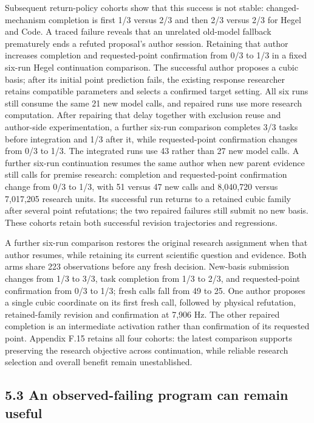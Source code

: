 \documentclass[11pt,a4paper]{article}
\begin{document}
Subsequent return-policy cohorts show that this success is not stable: changed-mechanism completion is first 1/3 versus 2/3 and then 2/3 versus 2/3 for Hegel and Code. A traced failure reveals that an unrelated old-model fallback prematurely ends a refuted proposal's author session. Retaining that author increases completion and requested-point confirmation from 0/3 to 1/3 in a fixed six-run Hegel continuation comparison. The successful author proposes a cubic basis; after its initial point prediction fails, the existing response researcher retains compatible parameters and selects a confirmed target setting. All six runs still consume the same 21 new model calls, and repaired runs use more research computation. After repairing that delay together with exclusion reuse and author-side experimentation, a further six-run comparison completes 3/3 tasks before integration and 1/3 after it, while requested-point confirmation changes from 0/3 to 1/3. The integrated runs use 43 rather than 27 new model calls. A further six-run continuation resumes the same author when new parent evidence still calls for premise research: completion and requested-point confirmation change from 0/3 to 1/3, with 51 versus 47 new calls and 8,040,720 versus 7,017,205 research units. Its successful run returns to a retained cubic family after several point refutations; the two repaired failures still submit no new basis. These cohorts retain both successful revision trajectories and regressions.


A further six-run comparison restores the original research assignment when that author resumes, while retaining its current scientific question and evidence. Both arms share 223 observations before any fresh decision. New-basis submission changes from 1/3 to 3/3, task completion from 1/3 to 2/3, and requested-point confirmation from 0/3 to 1/3; fresh calls fall from 49 to 25. One author proposes a single cubic coordinate on its first fresh call, followed by physical refutation, retained-family revision and confirmation at 7,906 Hz. The other repaired completion is an intermediate activation rather than confirmation of its requested point. Appendix F.15 retains all four cohorts: the latest comparison supports preserving the research objective across continuation, while reliable research selection and overall benefit remain unestablished.


\subsection*{5.3 An observed-failing program can remain useful}
\end{document}
